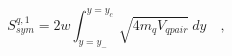 \begin{equation}
S^{q,1}_{sym}=2w\int^{y=y_c}_{y=y_-}\sqrt{4 m_q
V_{qpair}}~dy\quad,
\end{equation}

